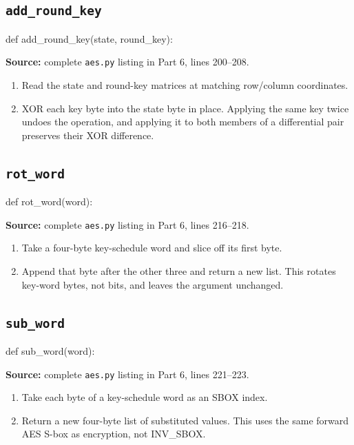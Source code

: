 \subsection{\texttt{add\_\allowbreak{}round\_\allowbreak{}key}}
\begin{lightcode}
def add_round_key(state, round_key):
\end{lightcode}
\noindent\textbf{Source:} complete \texttt{aes.py} listing in Part 6, lines 200--208.
\begin{enumerate}
\item Read the state and round-key matrices at matching row/column coordinates.
\item XOR each key byte into the state byte in place. Applying the same key twice undoes the operation, and applying it to both members of a differential pair preserves their XOR difference.
\end{enumerate}
\subsection{\texttt{rot\_\allowbreak{}word}}
\begin{lightcode}
def rot_word(word):
\end{lightcode}
\noindent\textbf{Source:} complete \texttt{aes.py} listing in Part 6, lines 216--218.
\begin{enumerate}
\item Take a four-byte key-schedule word and slice off its first byte.
\item Append that byte after the other three and return a new list. This rotates key-word bytes, not bits, and leaves the argument unchanged.
\end{enumerate}
\subsection{\texttt{sub\_\allowbreak{}word}}
\begin{lightcode}
def sub_word(word):
\end{lightcode}
\noindent\textbf{Source:} complete \texttt{aes.py} listing in Part 6, lines 221--223.
\begin{enumerate}
\item Take each byte of a key-schedule word as an SBOX index.
\item Return a new four-byte list of substituted values. This uses the same forward AES S-box as encryption, not INV\_SBOX.
\end{enumerate}
